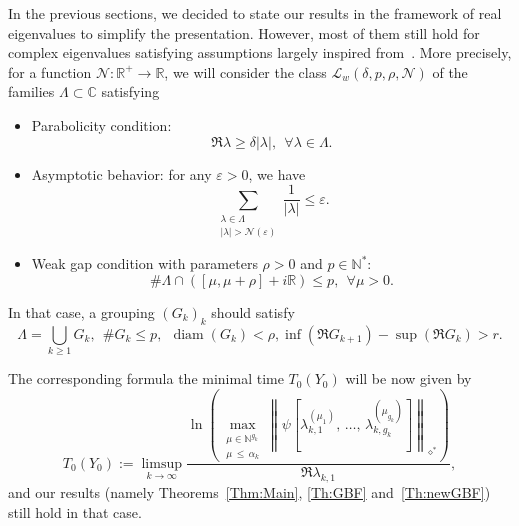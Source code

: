 \documentclass[AHL,Unicode,longabstracts]{cedram}
\newcommand{\Fzp}{Y_0}
\newcommand{\normeXalphas}[1]{\left\| #1 \right\|_{\diamond^*}}
\newcommand{\n}{g}
\newcommand{\LL}{\mathcal{L}}
\newcommand{\NN}{\mathcal{N}}
\newcommand{\N}{\mathbb{N}}
\newcommand{\R}{\mathbb{R}}
\newcommand{\C}{\mathbb{C}}
\DeclareMathOperator{\diam}{diam}
\let\oldforall\forall
\renewcommand*{\forall}{\mathrel{\oldforall}}
\begin{document}
In the previous sections, we decided to state our results in the framework of real eigenvalues to simplify the presentation. However, most of them still hold for complex eigenvalues satisfying assumptions largely inspired from~\cite{AmmarKhodjaBenabdallahGonzalez-BurgosdeTeresa:2014}. More precisely, for a function $\NN:\R^+\to \R$, we will consider the class $\LL_w(\delta,p,\rho,\NN)$ of the families $\Lambda\subset \C$ satisfying
\begin{itemize}
\item Parabolicity condition:
\[
\Re \lambda \geq \delta |\lambda|, \ \ \forall \lambda\in \Lambda.
\]
\item Asymptotic behavior: for any $\varepsilon>0$, we have
\[
\sum_{\substack{\lambda\in \Lambda\\ |\lambda|>\NN(\varepsilon)}} \frac{1}{|\lambda|} \leq \varepsilon.
\]
\item Weak gap condition with parameters $\rho>0$ and $p\in \N^*$:
\[
\# \Lambda \cap ([\mu,\mu+\rho]+i\R) \leq p, \ \ \forall \mu>0.
\]
\end{itemize}

In that case, a grouping $(G_k)_k$ should satisfy
\[
\Lambda=\bigcup_{k\geq 1} G_k, \ \ \# G_k\leq p, \ \ \diam(G_k)<\rho, \inf(\Re G_{k+1}) - \sup (\Re G_k) > r.
\]

The corresponding formula the minimal time $T_0(\Fzp)$ will be now given by
\[
T_0(\Fzp) := \limsup_{k\to \infty} \frac{\ln \left(\max\limits_{\substack{\mu\in \N^{\n_k}\\ \mu\,\leq\,\alpha_k}} \normeXalphas{\psi\left[\lambda_{k,1}^{(\mu_1)},\,\dotsc,\,\lambda_{k,\n_k}^{(\mu_{\n_k})}\right]}\right)}{\Re \lambda_{k,1}},
\]
and our results (namely Theorems~\ref{Thm:Main}, \ref{Th:GBF} and~\ref{Th:newGBF}) still hold in that case.
\end{document}
